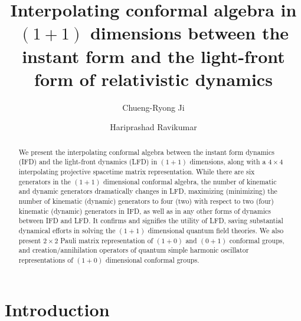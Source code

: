 \documentclass[%
 reprint,
superscriptaddress,
 amsmath,amssymb,
 aps,
]{revtex4-2}
\begin{document}

\title{Interpolating conformal algebra in \texorpdfstring{$(1+1)$}{TEXT} dimensions between the instant form and the light-front form of relativistic dynamics}

\author{Chueng-Ryong Ji}

\author{Hariprashad Ravikumar}


\begin{abstract}
We present the interpolating conformal algebra between the instant form dynamics (IFD) and the light-front dynamics (LFD) in $(1+1)$ dimensions, along with a $4\times4$ interpolating projective spacetime matrix representation. While there are six generators in the $(1+1)$ dimensional conformal algebra, the number of kinematic and dynamic generators dramatically changes in LFD, maximizing (minimizing) the number of kinematic (dynamic) generators to four (two) with respect to two (four) kinematic (dynamic) generators in IFD, as well as in any other forms of dynamics between IFD and LFD. It confirms and signifies the utility of LFD, saving substantial dynamical efforts in solving the $(1+1)$ dimensional quantum field theories. We also present $2\times2$ Pauli matrix representation of $(1+0)$ and $(0+1)$ conformal groups, and creation/annihilation operators of quantum simple harmonic oscillator representations of $(1+0)$ dimensional conformal groups. 


\end{abstract}
\maketitle


\section{Introduction}
\label{sec:introduction}
\end{document}
